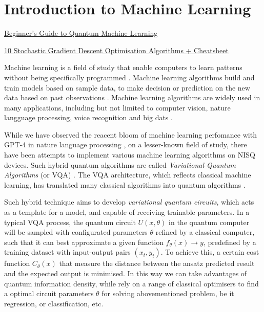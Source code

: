 \section{Introduction to Machine Learning} \label{Sec: Introduction to Machine Learning}

\href{https://blog.paperspace.com/beginners-guide-to-quantum-machine-learning/}{Beginner's Guide to Quantum Machine Learning}

\href{https://towardsdatascience.com/10-gradient-descent-optimisation-algorithms-86989510b5e9}{10 Stochastic Gradient Descent Optimisation Algorithms + Cheatsheet}



Machine learning is a field of study that enable computers to learn patterns without being specifically programmed \cite{kaurIntroductionMachineLearning2021}.
Machine learning algorithms build and train models based on sample data, to make decision or prediction on the new data based on past observations \cite{kozaAutomatedDesignBoth1996}.
Machine learning algorithms are widely used in many applications, including but not limited to computer vision, nature langguage processing, voice recognition and big dats \cite{khanMachineLearningComputer2020, zhangNaturalLanguageProcessing2021,tandelVoiceRecognitionVoice2020,elbouchefryLearningBigData2020, shindeReviewMachineLearning2018}.

While we have observed the reacent bloom of machine learning perfomance with GPT-4 in nature language processing \cite{openaiGPT4TechnicalReport2023}, on a lesser-known field of study, there have been attempts to implement various machine learning algorithms on NISQ devices.
Such hybrid quantum algorithms are called \emph{Variational Quantum Algorithms} (or VQA) \cite{cerezoVariationalQuantumAlgorithms2021}.
The VQA architecture, which reflects classical machine learning, has translated many classical algorithms into quantum algorithms \cite{zoufalVariationalQuantumBoltzmann2021a, tillyVariationalQuantumEigensolver2021a}.

Such hybrid technique aims to develop \emph{variational quantum circuits}, which acts as a template for a model, and capable of receiving trainable parameters.
In a typical VQA process, the quantum circuit $U(x, \theta)$ in the quantum computer will be sampled with configurated parameters $\theta$ refined by a classical computer, such that it can best approximate a given function ${f_\theta(x) \rightarrow y}$, predefined by a training dataset with input-output pairs $(x_t, y_t)$.
To achieve this, a certain cost function ${C_\theta(x)}$ that measure the distance between the ansatz predicted result and the expected output is minimised.
In this way we can take advantages of quantum information density, while rely on a range of classical optimisers to find a optimal circuit parameters $\theta$ for solving abovementioned problem, be it regression, or classification, etc.

